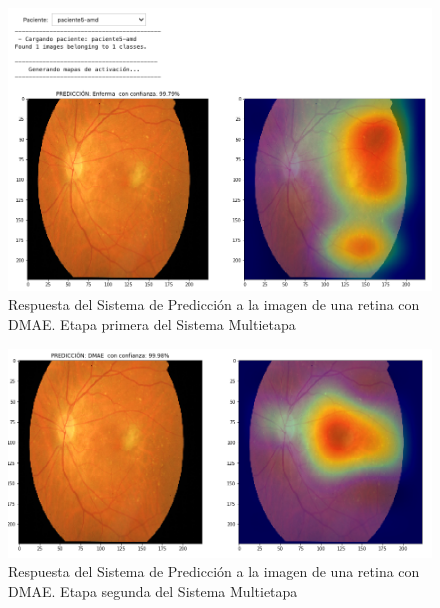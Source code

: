 \documentclass[
  12pt,
  spanish,
  a4paperpaper,
]{report}
\begin{document}
\begin{figure}
\centering
\includegraphics[width=1\textwidth,height=\textheight]{source/figures/pred1.png}
\caption{Respuesta del Sistema de Predicción a la imagen de una retina
con DMAE. Etapa primera del Sistema Multietapa \label{pred1}}
\end{figure}

\begin{figure}
\centering
\includegraphics[width=1\textwidth,height=\textheight]{source/figures/pred2.png}
\caption{Respuesta del Sistema de Predicción a la imagen de una retina
con DMAE. Etapa segunda del Sistema Multietapa \label{pred2}}
\end{figure}
\end{document}
